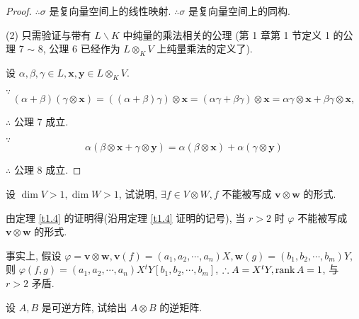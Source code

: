 \documentclass{ctexart}
\begin{document}
\begin{proof}
    $\therefore\sigma$ 是复向量空间上的线性映射. $\therefore\sigma$ 是复向量空间上的同构.

    (2) 只需验证与带有 $L\backslash K$ 中纯量的乘法相关的公理 (第 1 章第 1 节定义 1 的公理 7 $\sim$ 8, 公理 6 已经作为 $L\otimes_KV$ 上纯量乘法的定义了).

    设 $\alpha,\beta,\gamma\in L,\boldsymbol{x},\boldsymbol{y}\in L\otimes_KV$.

    $\because$
    \[(\alpha+\beta)(\gamma\otimes\boldsymbol{x})=((\alpha+\beta)\gamma)\otimes\boldsymbol{x}=(\alpha\gamma+\beta\gamma)\otimes\boldsymbol{x}=\alpha\gamma\otimes\boldsymbol{x}+\beta\gamma\otimes\boldsymbol{x},\]

    $\therefore$ 公理 7 成立.

    $\because$
    \[\alpha(\beta\otimes\boldsymbol{x}+\gamma\otimes\boldsymbol{y})=\alpha(\beta\otimes\boldsymbol{x})+\alpha(\gamma\otimes\boldsymbol{y})\]

    $\therefore$ 公理 8 成立.
\end{proof}
\begin{exercise}%
    设 $\dim V>1,\dim W>1$, 试说明, $\exists f\in V\otimes W,f$ 不能被写成 $\boldsymbol{v}\otimes\boldsymbol{w}$ 的形式.
\end{exercise}
\begin{solution}
    由定理 \ref{t1.4} 的证明得(沿用定理 \ref{t1.4} 证明的记号), 当 $r>2$ 时 $\varphi$ 不能被写成 $\boldsymbol{v}\otimes\boldsymbol{w}$ 的形式.
    
    事实上, 假设 $\varphi=\boldsymbol{v}\otimes\boldsymbol{w},\boldsymbol{v}(f)=(a_1,a_2,\cdots,a_n)X,\boldsymbol{w}(g)=(b_1,b_2,\cdots,b_m)Y$, 则 $\varphi(f,g)=(a_1,a_2,\cdots,a_n)X{}^tY[b_1,b_2,\cdots,b_m]$, $\therefore A=X{}^tY,\operatorname{rank} A=1$, 与 $r>2$ 矛盾.
\end{solution}
\begin{exercise}%
    设 $A,B$ 是可逆方阵, 试给出 $A\otimes B$ 的逆矩阵.
\end{exercise}
\end{document}
